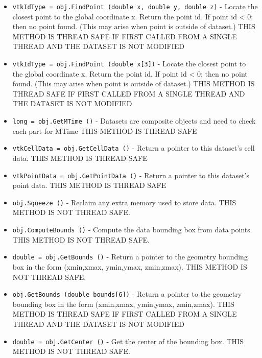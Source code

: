 \begin{itemize}
\item  \verb|vtkIdType = obj.FindPoint (double x, double y, double z)| -  Locate the closest point to the global coordinate x. Return the
 point id. If point id < 0; then no point found. (This may arise
 when point is outside of dataset.)
 THIS METHOD IS THREAD SAFE IF FIRST CALLED FROM A SINGLE THREAD AND
 THE DATASET IS NOT MODIFIED

\item  \verb|vtkIdType = obj.FindPoint (double x[3])| -  Locate the closest point to the global coordinate x. Return the
 point id. If point id < 0; then no point found. (This may arise
 when point is outside of dataset.)
 THIS METHOD IS THREAD SAFE IF FIRST CALLED FROM A SINGLE THREAD AND
 THE DATASET IS NOT MODIFIED

\item  \verb|long = obj.GetMTime ()| -  Datasets are composite objects and need to check each part for MTime
 THIS METHOD IS THREAD SAFE

\item  \verb|vtkCellData = obj.GetCellData ()| -  Return a pointer to this dataset's cell data.
 THIS METHOD IS THREAD SAFE

\item  \verb|vtkPointData = obj.GetPointData ()| -  Return a pointer to this dataset's point data.
 THIS METHOD IS THREAD SAFE

\item  \verb|obj.Squeeze ()| -  Reclaim any extra memory used to store data.
 THIS METHOD IS NOT THREAD SAFE.

\item  \verb|obj.ComputeBounds ()| -  Compute the data bounding box from data points.
 THIS METHOD IS NOT THREAD SAFE.

\item  \verb|double = obj.GetBounds ()| -  Return a pointer to the geometry bounding box in the form
 (xmin,xmax, ymin,ymax, zmin,zmax).
 THIS METHOD IS NOT THREAD SAFE.

\item  \verb|obj.GetBounds (double bounds[6])| -  Return a pointer to the geometry bounding box in the form
 (xmin,xmax, ymin,ymax, zmin,zmax).
 THIS METHOD IS THREAD SAFE IF FIRST CALLED FROM A SINGLE THREAD AND
 THE DATASET IS NOT MODIFIED

\item  \verb|double = obj.GetCenter ()| -  Get the center of the bounding box.
 THIS METHOD IS NOT THREAD SAFE.


\end{itemize}
